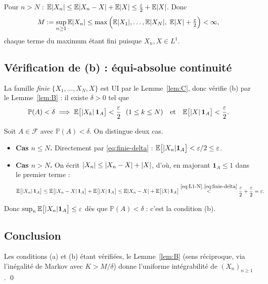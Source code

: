 \documentclass[11pt,a4paper]{article}
\theoremstyle{definition}
\theoremstyle{remark}
\newcommand{\E}{\mathbb{E}}
\newcommand{\PP}{\mathbb{P}}
\newcommand{\F}{\mathcal{F}}
\newcommand{\ind}[1]{\mathbf{1}_{#1}}
\DeclarePairedDelimiter{\abs}{\lvert}{\rvert}
\begin{document}
Pour $n > N$ :
$\E\abs{X_n} \le \E\abs{X_n - X} + \E\abs{X} \le \frac{\varepsilon}{2} + \E\abs{X}$.
Donc
\[
M := \sup_{n \ge 1} \E\abs{X_n}
\le \max\Big(\E\abs{X_1}, \dots, \E\abs{X_N},\; \E\abs{X} + \tfrac{\varepsilon}{2}\Big)
< \infty,
\]
chaque terme du maximum étant fini puisque $X_n, X \in L^1$.

\subsection{Vérification de (b) : équi-absolue continuité}

La famille \emph{finie} $\{X_1, \dots, X_N, X\}$ est UI par le
Lemme~\ref{lem:C}, donc vérifie (b) par le Lemme~\ref{lem:B} : il existe
$\delta > 0$ tel que
\begin{equation}\label{eq:finie-delta}
\PP(A) < \delta
\;\Longrightarrow\;
\E\big[\abs{X_k}\,\ind{A}\big] < \frac{\varepsilon}{2} \ \ (1 \le k \le N)
\quad\text{et}\quad
\E\big[\abs{X}\,\ind{A}\big] < \frac{\varepsilon}{2}.
\end{equation}

Soit $A \in \F$ avec $\PP(A) < \delta$. On distingue deux cas.

\begin{itemize}
\item \textbf{Cas $n \le N$.} Directement par \eqref{eq:finie-delta} :
$\E\big[\abs{X_n}\ind{A}\big] < \varepsilon/2 \le \varepsilon$.
\item \textbf{Cas $n > N$.} On écrit $\abs{X_n} \le \abs{X_n - X} + \abs{X}$,
d'où, en majorant $\ind{A} \le 1$ dans le premier terme :
\[
\E\big[\abs{X_n}\,\ind{A}\big]
\le \E\big[\abs{X_n - X}\,\ind{A}\big] + \E\big[\abs{X}\,\ind{A}\big]
\le \E\abs{X_n - X} + \E\big[\abs{X}\,\ind{A}\big]
\overset{\eqref{eq:L1-N},\,\eqref{eq:finie-delta}}{<}
\frac{\varepsilon}{2} + \frac{\varepsilon}{2} = \varepsilon.
\]
\end{itemize}

Donc $\sup_n \E\big[\abs{X_n}\ind{A}\big] \le \varepsilon$ dès que
$\PP(A) < \delta$ : c'est la condition (b).

\subsection{Conclusion}

Les conditions (a) et (b) étant vérifiées, le Lemme~\ref{lem:B} (sens
réciproque, via l'inégalité de Markov avec $K > M/\delta$) donne l'uniforme
intégrabilité de $(X_n)_{n \ge 1}$. \qed
\end{document}
